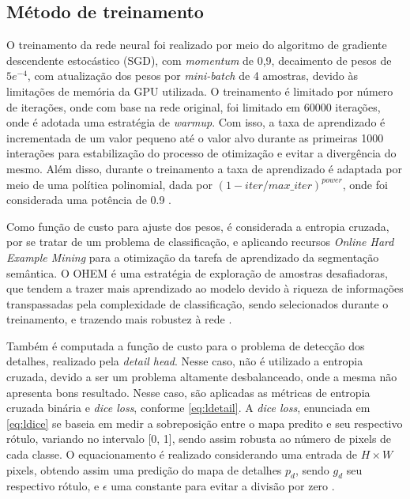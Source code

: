 \documentclass[conference]{IEEEtran}
\begin{document}
\subsection{Método de treinamento}


O treinamento da rede neural foi realizado por meio do algoritmo de gradiente descendente estocástico (SGD), com \textit{momentum} de 0,9, decaimento de pesos de $5e^{-4}$, com atualização dos pesos por \textit{mini-batch} de 4 amostras, devido às limitações de memória da GPU utilizada. O treinamento é limitado por número de iterações, onde com base na rede original, foi limitado em 60000 iterações, onde é adotada uma estratégia de \textit{warmup}. Com isso, a taxa de aprendizado é incrementada de um valor pequeno até o valor alvo durante as primeiras 1000 interações para estabilização do processo de otimização e evitar a divergência do mesmo. Além disso, durante o treinamento a taxa de aprendizado é adaptada por meio de uma política polinomial, dada por $(1 - iter/max\_iter)^{power}$, onde foi considerada uma potência de 0.9 \cite{fan2021RethinkingBiSeNetRealtime}.

Como função de custo para ajuste dos pesos, é considerada a entropia cruzada, por se tratar de um problema de classificação, e aplicando recursos \textit{Online Hard Example Mining} para a otimização da tarefa de aprendizado da segmentação semântica. O OHEM é uma estratégia de exploração de amostras desafiadoras, que tendem a trazer mais aprendizado ao modelo devido à riqueza de informações transpassadas pela complexidade de classificação, sendo selecionados durante o treinamento, e trazendo mais robustez à rede \cite{shrivastava2016TrainingRegionbasedObject}. 

Também é computada a função de custo para o problema de detecção dos detalhes, realizado pela \textit{detail head}. Nesse caso, não é utilizado a entropia cruzada, devido a ser um problema altamente desbalanceado, onde a mesma não apresenta bons resultado. Nesse caso, são aplicadas as métricas de entropia cruzada binária e \textit{dice loss}, conforme \eqref{eq:ldetail}. A \textit{dice loss}, enunciada em \eqref{eq:ldice} se baseia em medir a sobreposição entre o mapa predito e seu respectivo rótulo, variando no intervalo [0, 1], sendo assim robusta ao número de pixels de cada classe. O equacionamento é realizado considerando uma entrada de $H \times W$ pixels, obtendo assim uma predição do mapa de detalhes $p_d$, sendo $g_d$ seu respectivo rótulo, e $\epsilon$ uma constante para evitar a divisão por zero \cite{deng2018LearningPredictCrisp}.
\end{document}
